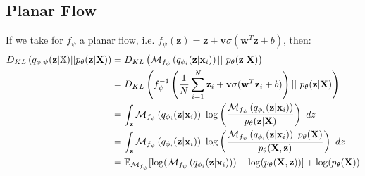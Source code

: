 \documentclass[english]{article}
\begin{document}
    \subsection*{Planar Flow}
    If we take for $f_{\psi}$ a planar flow, i.e. $f_{\psi}(\textbf{z}) = \textbf{z} + \textbf{v}\sigma (\textbf{w}^T\textbf{z} + b)$, then:
    \begin{equation}
        \begin{split}
            \DklTrueApprox &=D_{KL} \left(\Mnfi ||\ \truedistr \right)\\
            &=D_{KL} \left(f_{\psi}^{-1}\left( \frac{1}{N} \sum ^N _{i=1} \textbf{z}_i +\textbf{v} \sigma (\textbf{w}^T \textbf{z}_i +b) \right) ||\ \truedistr \right)\\
            &= \int _{\textbf{z}} \Mnfi \ \log \left( \frac{\Mnfi}{\truedistr} \right)\ dz\\
            &= \int _{\textbf{z}} \Mnfi \ \log \left( \frac{\Mnfi \ p_{\theta}(\textbf{X})}{p_{\theta}(\textbf{X},\textbf{z})} \right)\ dz\\
            &= \mathbb{E}_{\mathcal{M}_{f_{\psi}}}[\log (\Mnfi) - \log(p_{\theta}(\textbf{X},\textbf{z}))] + \log(p_{\theta}(\textbf{X}))
        \end{split}
    \end{equation}

    \newpage

    \printbibliography
\end{document}
